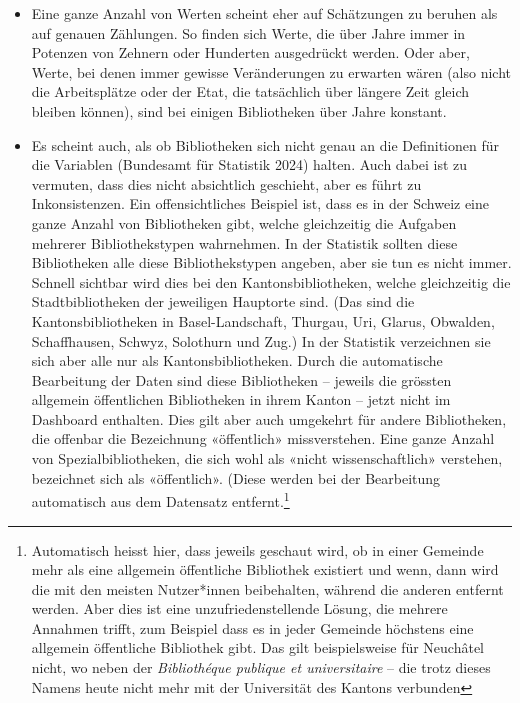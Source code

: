 \documentclass[a4paper,
fontsize=11pt,
oneside,
numbers=noperiodatend,
parskip=half-,
bibliography=totoc,
final
]{scrartcl}
\begin{document}
\begin{itemize}
\item
  Eine ganze Anzahl von Werten scheint eher auf Schätzungen zu beruhen
  als auf genauen Zählungen. So finden sich Werte, die über Jahre immer
  in Potenzen von Zehnern oder Hunderten ausgedrückt werden. Oder aber,
  Werte, bei denen immer gewisse Veränderungen zu erwarten wären (also
  nicht die Arbeitsplätze oder der Etat, die tatsächlich über längere
  Zeit gleich bleiben können), sind bei einigen Bibliotheken über Jahre
  konstant.
\item
  Es scheint auch, als ob Bibliotheken sich nicht genau an die
  Definitionen für die Variablen (Bundesamt für Statistik 2024) halten.
  Auch dabei ist zu vermuten, dass dies nicht absichtlich geschieht,
  aber es führt zu Inkonsistenzen. Ein offensichtliches Beispiel ist,
  dass es in der Schweiz eine ganze Anzahl von Bibliotheken gibt, welche
  gleichzeitig die Aufgaben mehrerer Bibliothekstypen wahrnehmen. In der
  Statistik sollten diese Bibliotheken alle diese Bibliothekstypen
  angeben, aber sie tun es nicht immer. Schnell sichtbar wird dies bei
  den Kantonsbibliotheken, welche gleichzeitig die Stadtbibliotheken der
  jeweiligen Hauptorte sind. (Das sind die Kantonsbibliotheken in
  Basel-Landschaft, Thurgau, Uri, Glarus, Obwalden, Schaffhausen,
  Schwyz, Solothurn und Zug.) In der Statistik verzeichnen sie sich aber
  alle nur als Kantonsbibliotheken. Durch die automatische Bearbeitung
  der Daten sind diese Bibliotheken -- jeweils die grössten allgemein
  öffentlichen Bibliotheken in ihrem Kanton -- jetzt nicht im Dashboard
  enthalten. Dies gilt aber auch umgekehrt für andere Bibliotheken, die
  offenbar die Bezeichnung «öffentlich» missverstehen. Eine ganze Anzahl
  von Spezialbibliotheken, die sich wohl als «nicht wissenschaftlich»
  verstehen, bezeichnet sich als «öffentlich». (Diese werden bei der
  Bearbeitung automatisch aus dem Datensatz entfernt.\footnote{Automatisch
    heisst hier, dass jeweils geschaut wird, ob in einer Gemeinde mehr
    als eine allgemein öffentliche Bibliothek existiert und wenn, dann
    wird die mit den meisten Nutzer*innen beibehalten, während die
    anderen entfernt werden. Aber dies ist eine unzufriedenstellende
    Lösung, die mehrere Annahmen trifft, zum Beispiel dass es in jeder
    Gemeinde höchstens eine allgemein öffentliche Bibliothek gibt. Das
    gilt beispielsweise für Neuchâtel nicht, wo neben der
    \emph{Bibliothéque publique et universitaire} -- die trotz dieses
    Namens heute nicht mehr mit der Universität des Kantons verbunden
}
\end{itemize}
\end{document}
